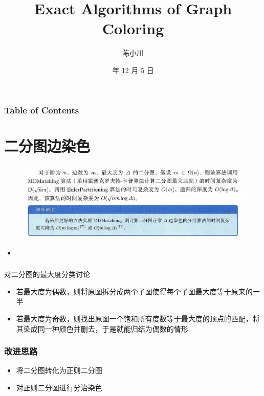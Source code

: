 \documentclass[UTF8]{beamer}
\title{Exact Algorithms of Graph Coloring}
\author{\heiti 231240058  陈小川}
\institute{Nanjing University}
\date{\heiti 2024 年 12 月 5 日}
\begin{document}
\frame{\titlepage}


\begin{frame}
\frametitle{Table of Contents}
\tableofcontents
\end{frame}


\section{二分图边染色}

\begin{frame}
  \frametitle{}
\begin{figure}
  \centering
\includegraphics[scale=0.4]{figs/motivation.png}
\end{figure}
\pause
\begin{itemize}
  \item {}
\end{itemize}
\end{frame}

\begin{frame}
  \frametitle{}
  对二分图的最大度分类讨论
  \begin{itemize}
    \item 若最大度为偶数，则将原图拆分成两个子图使得每个子图最大度等于原来的一半
    \item 若最大度为奇数，则找出原图一个饱和所有度数等于最大度的顶点的匹配，将其染成同一种颜色并删去，于是就能归结为偶数的情形
  \end{itemize}
\end{frame}

\begin{frame}
\frametitle{改进思路}
\begin{itemize}
  \item 将二分图转化为正则二分图
  \item 对正则二分图进行分治染色
\end{itemize}
\end{frame}
\end{document}
